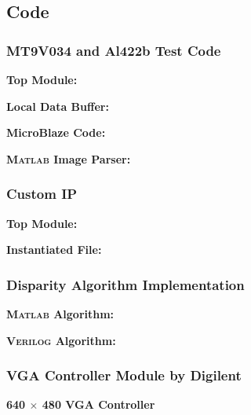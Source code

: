 \subsection{Code}

\subsubsection{MT9V034 and Al422b Test Code} \label{mt9v034TestCode}
\textbf{Top Module:}
\singlespacing

\doublespacing
\par
\textbf{Local Data Buffer:}
\singlespacing

\doublespacing
\par
\textbf{MicroBlaze Code:}
\label{camTestC}
\singlespacing

\doublespacing
\par
\textbf{\textsc{Matlab} Image Parser:}
\label{camTestMatlab}
\singlespacing

\doublespacing

\subsubsection{Custom IP} 
\textbf{Top Module:} \label{customIPtop}
\singlespacing

\doublespacing

\par
\textbf{Instantiated File:} \label{customIPaxi}
\singlespacing

\doublespacing

\subsubsection{Disparity Algorithm Implementation} \label{disparityTestMatlab}
\textbf{\textsc{Matlab} Algorithm:}
\singlespacing

\doublespacing

\par
\textbf{\textsc{Verilog} Algorithm:}
\singlespacing

\doublespacing

\subsubsection{VGA Controller Module by Digilent} \label{vga_controller}
\textbf{640 $\times$ 480 VGA Controller}
\singlespacing

\doublespacing

